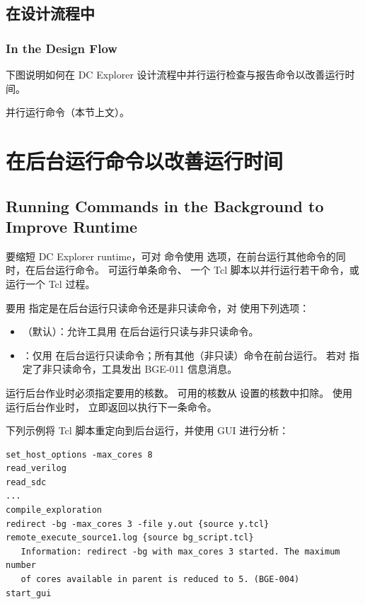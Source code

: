 \subsection{在设计流程中}
\subsubsection*{In the Design Flow}

下图说明如何在 DC Explorer 设计流程中并行运行检查与报告命令以改善运行时间。


\begin{seeAlsoBox}
并行运行命令（本节上文）。
\end{seeAlsoBox}

\section{在后台运行命令以改善运行时间}
\subsection*{Running Commands in the Background to Improve Runtime}

要缩短 DC Explorer runtime，可对  命令使用  选项，在前台运行其他命令的同时，在后台运行命令。
可运行单条命令、 一个 Tcl 脚本以并行运行若干命令，或运行一个 Tcl 过程。

要用  指定是在后台运行只读命令还是非只读命令，对  使用下列选项：
\begin{itemize}
  \item {}（默认）：允许工具用  在后台运行只读与非只读命令。
  \item {}：仅用  在后台运行只读命令；所有其他（非只读）命令在前台运行。
        若对  指定了非只读命令，工具发出 BGE-011 信息消息。
\end{itemize}

运行后台作业时必须指定要用的核数。 可用的核数从  设置的核数中扣除。
使用  运行后台作业时， 立即返回以执行下一条命令。

下列示例将 Tcl 脚本重定向到后台运行，并使用 GUI 进行分析：
\begin{lstlisting}
set_host_options -max_cores 8
read_verilog
read_sdc
...
compile_exploration
redirect -bg -max_cores 3 -file y.out {source y.tcl}
remote_execute_source1.log {source bg_script.tcl}
   Information: redirect -bg with max_cores 3 started. The maximum number
   of cores available in parent is reduced to 5. (BGE-004)
start_gui
\end{lstlisting}

